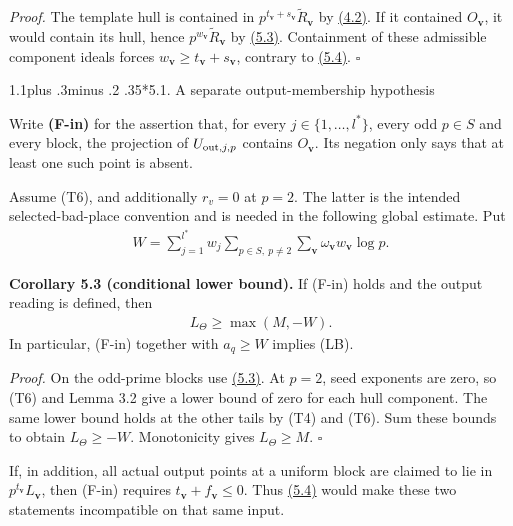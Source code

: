 \documentclass[11pt,a4paper]{amsart}
\makeatletter
\renewcommand\subsection{\@startsection{subsection}{2}{\z@}
{1.1\baselineskip plus .3\baselineskip minus .2\baselineskip}
{.35\baselineskip}{\normalfont\bfseries}}
\makeatother
\begin{document}
\emph{Proof.} The template hull is contained in $p^{t_{\mathbf v}+s_{\mathbf v}}\widetilde R_{\mathbf v}$ by \hyperref[eq:4.2]{(4.2)}. If it contained $O_{\mathbf v}$, it would contain its hull, hence $p^{w_{\mathbf v}}\widetilde R_{\mathbf v}$ by \hyperref[eq:5.3]{(5.3)}. Containment of these admissible component ideals forces $w_{\mathbf v}\ge t_{\mathbf v}+s_{\mathbf v}$, contrary to \hyperref[eq:5.4]{(5.4)}. \hfill$\square$


\subsection*{5.1. A separate output-membership hypothesis}

Write \textbf{(F-in)} for the assertion that, for every $j\in\{1,\ldots,l^*\}$, every odd $p\in S$ and every block, the projection of $U_{{\rm out},j,p}$ contains $O_{\mathbf v}$. Its negation only says that at least one such point is absent.


Assume (T6), and additionally $r_v=0$ at $p=2$. The latter is the intended selected-bad-place convention and is needed in the following global estimate. Put
\begin{equation}
\begin{gathered}
W=\sum_{j=1}^{l^*}w_j\sum_{p\in S,\ p\ne2}\sum_{\mathbf v}
\omega_{\mathbf v}w_{\mathbf v}\log p.
\end{gathered}
\tag{5.5}\label{eq:5.5}
\end{equation}
\par\smallskip\noindent\textbf{Corollary 5.3 (conditional lower bound).} If (F-in) holds and the output reading is defined, then
\begin{equation}
\begin{gathered}
L_\Theta\ge\max(M,-W).
\end{gathered}
\tag{5.6}\label{eq:5.6}
\end{equation}
In particular, (F-in) together with $a_q\ge W$ implies (LB).


\emph{Proof.} On the odd-prime blocks use \hyperref[eq:5.3]{(5.3)}. At $p=2$, seed exponents are zero, so (T6) and Lemma 3.2 give a lower bound of zero for each hull component. The same lower bound holds at the other tails by (T4) and (T6). Sum these bounds to obtain $L_\Theta\ge-W$. Monotonicity gives $L_\Theta\ge M$. \hfill$\square$


If, in addition, all actual output points at a uniform block are claimed to lie in $p^{t_{\mathbf v}}L_{\mathbf v}$, then (F-in) requires $t_{\mathbf v}+f_{\mathbf v}\le0$. Thus \hyperref[eq:5.4]{(5.4)} would make these two statements incompatible on that same input.
\end{document}
